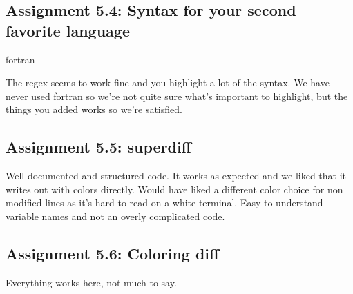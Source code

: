 \documentclass[a4paper]{article}
\begin{document}
\subsection*{Assignment 5.4: Syntax for your second favorite language}
fortran

\vspace{5mm}

\noindent The regex seems to work fine and you highlight a lot of the syntax. We have never used fortran so we're not quite sure what's important to highlight, but the things you added works so we're satisfied.

\subsection*{Assignment 5.5: superdiff}

Well documented and structured code. It works as expected and we liked that it writes out with colors directly. Would have liked a different color choice for non modified lines as it's hard to read on a white terminal. Easy to understand variable names and not an overly complicated code. 

\subsection*{Assignment 5.6:  Coloring diff}
Everything works here, not much to say.



\end{document}
